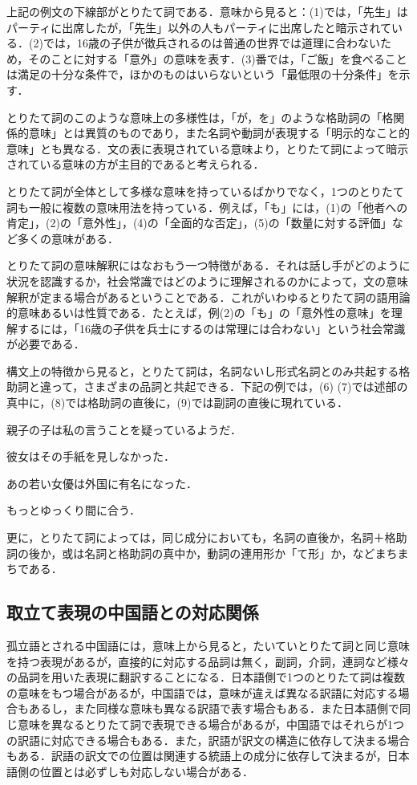 上記の例文の下線部がとりたて詞である．意味から見ると：(1)では，「先生」はパーティに出席したが，「先生」以外の人もパーティに出席したと暗示されている．(2)では，16歳の子供が徴兵されるのは普通の世界では道理に合わないため，そのことに対する「意外」の意味を表す．(3)番では，「ご飯」を食べることは満足の十分な条件で，ほかのものはいらないという「最低限の十分条件」を示す．

とりたて詞のこのような意味上の多様性は，「が，を」のような格助詞の「格関係的意味」とは異質のものであり，また名詞や動詞が表現する「明示的なこと的意味」とも異なる．文の表に表現されている意味より，とりたて詞によって暗示されている意味の方が主目的であると考えられる．

とりたて詞が全体として多様な意味を持っているばかりでなく，1つのとりたて詞も一般に複数の意味用法を持っている．例えば，「も」には，(1)の「他者への肯定」，(2)の「意外性」，(4)の「全面的な否定」，(5)の「数量に対する評価」など多くの意味がある．

とりたて詞の意味解釈にはなおもう一つ特徴がある．それは話し手がどのように状況を認識するか，社会常識ではどのように理解されるのかによって，文の意味解釈が定まる場合があるということである．これがいわゆるとりたて詞の語用論的意味あるいは性質である．たとえば，例(2)の「も」の「意外性の意味」を理解するには，「16歳の子供を兵士にするのは常理には合わない」という社会常識が必要である．

構文上の特徴から見ると，とりたて詞は，名詞ないし形式名詞とのみ共起する格助詞と違って，さまざまの品詞と共起できる．下記の例では，(6) (7)では述部の真中に，(8)では格助詞の直後に，(9)では副詞の直後に現れている．

\begin{enumerates}
 \setcounter{enumi}{5}
 \item 親子の子は私の言うことを疑っているようだ．
 \item 彼女はその手紙を見しなかった．
 \item あの若い女優は外国に有名になった．
 \item もっとゆっくり間に合う．
\end{enumerates}

更に，とりたて詞によっては，同じ成分においても，名詞の直後か，名詞＋格助詞の後か，或は名詞と格助詞の真中か，動詞の連用形か「て形」か，などまちまちである．

\subsection{取立て表現の中国語との対応関係}
孤立語とされる中国語には，意味上から見ると，たいていとりたて詞と同じ意味を持つ表現があるが，直接的に対応する品詞は無く，副詞，介詞，連詞など様々の品詞を用いた表現に翻訳することになる．日本語側で1つのとりたて詞は複数の意味をもつ場合があるが，中国語では，意味が違えば異なる訳語に対応する場合もあるし，また同様な意味も異なる訳語で表す場合もある．また日本語側で同じ意味を異なるとりたて詞で表現できる場合があるが，中国語ではそれらが1つの訳語に対応できる場合もある．また，訳語が訳文の構造に依存して決まる場合もある．訳語の訳文での位置は関連する統語上の成分に依存して決まるが，日本語側の位置とは必ずしも対応しない場合がある．

